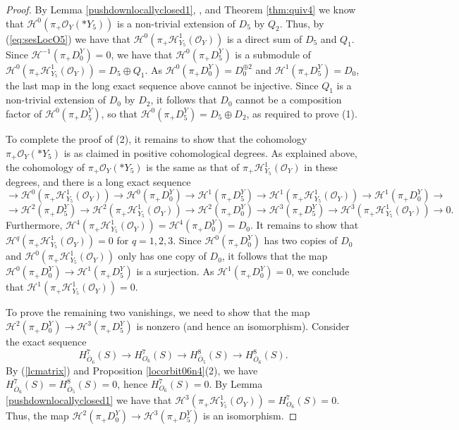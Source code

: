 \documentclass[11pt,reqno]{amsart}
\newcommand{\mc}[1]{\mathcal{#1}}
\newcommand{\ol}[1]{\overline{#1}}
\numberwithin{equation}{section}
\begin{document}
\begin{proof}
 By Lemma \ref{pushdownlocallyclosed1}, \cite[Lemma 3.11]{lHorincz2019categories}, and Theorem \ref{thm:quiv4} we know that $\mc{H}^0(\pi_{+}\mathcal{O}_Y(\ast Y_5))$ is a non-trivial extension of $D_5$ by $Q_2$. Thus, by (\ref{eq:sesLocO5}) we have that $\mc{H}^{0}(\pi_{+}\mathscr{H}^1_{Y_5}(\mc{O}_Y))$ is a direct sum of $D_5$ and $Q_1$. Since $\mc{H}^{-1}(\pi_+D_0^Y)=0$, we have that $\mc{H}^{0}(\pi_{+}D^Y_5)$ is a submodule of $\mc{H}^{0}(\pi_{+}\mathscr{H}^1_{Y_5}(\mc{O}_Y))=D_5\oplus Q_1$. As $\mc{H}^{0}(\pi_{+}D^Y_0)=D_0^{\oplus 2}$ and $ \mc{H}^{1}(\pi_{+}D^Y_5)=D_0$, the last map in the long exact sequence above cannot be injective. Since $Q_1$ is a non-trivial extension of $D_0$ by $D_2$, it follows that $D_0$ cannot be a composition factor of $\mc{H}^{0}(\pi_{+}D^Y_5)$, so that $\mc{H}^{0}(\pi_{+}D^Y_5)=D_5\oplus D_2$, as required to prove (1). 


To complete the proof of (2), it remains to show that the cohomology $\pi_{+}\mathcal{O}_Y(\ast Y_5)$ is as claimed in positive cohomological degrees. As explained above, the cohomology of $\pi_{+}\mathcal{O}_Y(\ast Y_5)$ is the same as that of $\pi_{+}\mathscr{H}^1_{Y_5}(\mc{O}_Y)$ in these degrees, and there is a long exact sequence 
$$
\to \mc{H}^{0}(\pi_{+}\mathscr{H}^1_{Y_5}(\mc{O}_Y))\to \mc{H}^{0}(\pi_{+}D^Y_0)\to \mc{H}^{1}(\pi_{+}D^Y_5)\to \mc{H}^{1}(\pi_{+}\mathscr{H}^1_{Y_5}(\mc{O}_Y))\to \mc{H}^{1}(\pi_{+}D^Y_0)\to  
$$ 
$$
\to \mc{H}^{2}(\pi_{+}D^Y_5)\to \mc{H}^{2}(\pi_{+}\mathscr{H}^1_{Y_5}(\mc{O}_Y))\to \mc{H}^{2}(\pi_{+}D^Y_0)\to \mc{H}^{3}(\pi_{+}D^Y_5)\to \mc{H}^{3}(\pi_{+}\mathscr{H}^1_{Y_5}(\mc{O}_Y))\to 0.
$$
Furthermore, $\mc{H}^{4}(\pi_{+}\mathscr{H}^1_{Y_5}(\mc{O}_Y))=\mc{H}^{4}(\pi_{+}D^Y_0)=D_0$. It remains to show that $\mc{H}^{q}(\pi_{+}\mathscr{H}^1_{Y_5}(\mc{O}_Y))=0$ for $q=1,2,3$. Since $\mc{H}^{0}(\pi_{+}D^Y_0)$ has two copies of $D_0$ and  $\mc{H}^{0}(\pi_{+}\mathscr{H}^1_{Y_5}(\mc{O}_Y))$ only has one copy of $D_0$, it follows that the map $\mc{H}^{0}(\pi_{+}D^Y_0)\to \mc{H}^{1}(\pi_{+}D^Y_5)$ is a surjection. As $\mc{H}^{1}(\pi_{+}D^Y_0)=0$, we conclude that $\mc{H}^{1}(\pi_{+}\mathscr{H}^1_{Y_5}(\mc{O}_Y))=0$.

To prove the remaining two vanishings, we need to show that the map $\mc{H}^{2}(\pi_{+}D^Y_0)\to \mc{H}^{3}(\pi_{+}D^Y_5)$ is nonzero (and hence an isomorphism). Consider the exact sequence
\[H^7_{\ol{O}_6}(S) \to H^7_{O_6}(S)\to H^8_{\ol{O}_5}(S)\to H^8_{\ol{O}_6}(S).\]
 By (\ref{lcmatrix}) and Proposition \ref{locorbit06n4}(2), we have $H^7_{\ol{O}_6}(S)=H^8_{\ol{O}_5}(S)=0$, hence $H^7_{O_6}(S)=0$. By Lemma \ref{pushdownlocallyclosed1} we have that $\mc{H}^{3}(\pi_{+}\mathscr{H}^1_{Y_5}(\mc{O}_Y))=H^7_{O_6}(S)=0$. Thus, the map $\mc{H}^{2}(\pi_{+}D^Y_0)\to \mc{H}^{3}(\pi_{+}D^Y_5)$ is an isomorphism.
 \end{proof}
\end{document}
